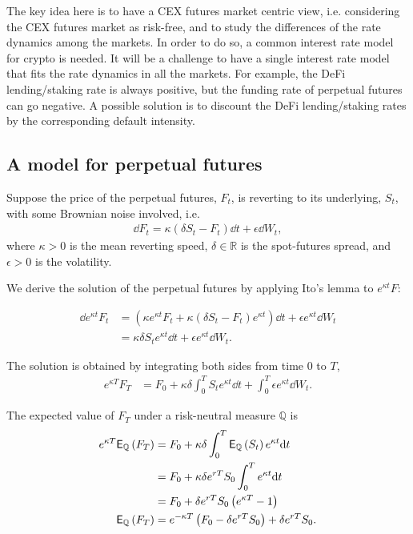 \documentclass[square]{article} %
\theoremstyle{plain}
\theoremstyle{definition} %
\begin{document}
The key idea here is to have a CEX futures market centric view, i.e. considering the CEX futures market as risk-free,
 and to study the differences of the rate dynamics among the markets. 
 In order to do so, a common interest rate model for crypto is needed. 
 It will be a challenge to have a single interest rate model that fits the rate dynamics in all the markets.
 For example, the DeFi lending/staking rate is always positive, but the funding rate of perpetual futures can go negative.  
 A possible solution is to discount the DeFi lending/staking rates by the corresponding default intensity.

\subsection{A model for perpetual futures}
Suppose the price of the perpetual futures, $F_t$, is reverting to its underlying, $S_t$, with some Brownian noise involved, i.e.
\begin{align*}
\dd F_t = \kappa \left(\delta S_t - F_t \right)\dd t + \epsilon \dd W_t,
\end{align*}
where $\kappa>0$ is the mean reverting speed, $\delta \in \mathbb{R}$ is the spot-futures spread, and $\epsilon>0$ is the volatility.

We derive the solution of the perpetual futures by applying Ito's lemma to $e^{\kappa t}F$:

\begin{align*}
\dd e^{\kappa t} F_t &= \left(\kappa e^{\kappa t}F_t+ \kappa \left(\delta S_t - F_t\right)e^{\kappa t}\right)\dd t + \epsilon e^{\kappa t}\dd W_t\\
                      &= \kappa \delta S_t e^{\kappa t}\dd t + \epsilon e^{\kappa t}\dd W_t.
\end{align*}

The solution is obtained by integrating both sides from time $0$ to $T$,
\begin{align*}
  e^{\kappa T} F_T &= F_0 +  \kappa \delta \int_0^T S_t e^{\kappa t}\dd t + \int_0^T \epsilon e^{\kappa t}\dd W_t.
  \end{align*}

The expected value of $F_T$ under a risk-neutral measure $\mathbb{Q}$ is
\begin{align*}
  e^{\kappa T} \mathbb{\sf E}_\mathbb{Q} \left(F_T\right) &= F_0 +  \kappa \delta \int_0^T \mathbb{\sf E}_\mathbb{Q}\left(S_t\right) e^{\kappa t}{\rm d} t\\
                                                          &= F_0 +  \kappa \delta e^{rT}S_0 \int_0^T  e^{\kappa t}{\rm d} t\\
                                                          &= F_0 +  \delta e^{rT}S_0 \left(e^{\kappa T} - 1\right)\\
               \mathbb{\sf E}_\mathbb{Q} \left(F_T\right) &= e^{-\kappa T}\left(F_0 - \delta e^{rT}S_0\right)  + \delta e^{rT}S_0.                              
\end{align*}
\end{document}
